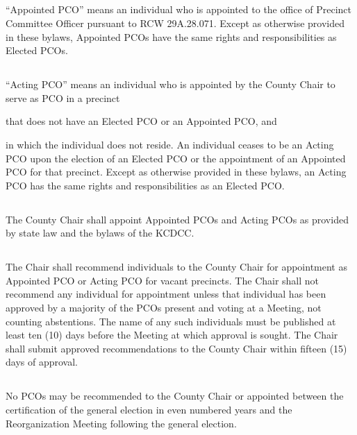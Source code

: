 \subsection{}
“Appointed PCO” means an individual who is appointed to the office of Precinct Committee Officer pursuant to RCW 29A.28.071. Except as otherwise provided in these bylaws, Appointed PCOs have the same rights and responsibilities as Elected PCOs.

\subsection{} \label{acting-pco}
“Acting PCO” means an individual who is appointed by the County Chair to serve as PCO in a precinct
\begin{inlinealphalist}
    \item that does not have an Elected PCO or an Appointed PCO, and
    \item in which the individual does not reside. An individual ceases to be an Acting PCO upon the election of an Elected PCO or the appointment of an Appointed PCO for that precinct. Except as otherwise provided in these bylaws, an Acting PCO has the same rights and responsibilities as an Elected PCO.
\end{inlinealphalist}

\subsection{}
The County Chair shall appoint Appointed PCOs and Acting PCOs as provided by state law and the bylaws of the KCDCC.

\subsection{}
The Chair shall recommend individuals to the County Chair for appointment as Appointed PCO or Acting PCO for vacant precincts. The Chair shall not recommend any individual for appointment unless that individual has been approved by a majority of the PCOs present and voting at a Meeting, not counting abstentions. The name of any such individuals must be published at least ten (10) days before the Meeting at which approval is sought. The Chair shall submit approved recommendations to the County Chair within fifteen (15) days of approval.

\subsection{}
No PCOs may be recommended to the County Chair or appointed between the certification of the general election in even numbered years and the Reorganization Meeting following the general election.

